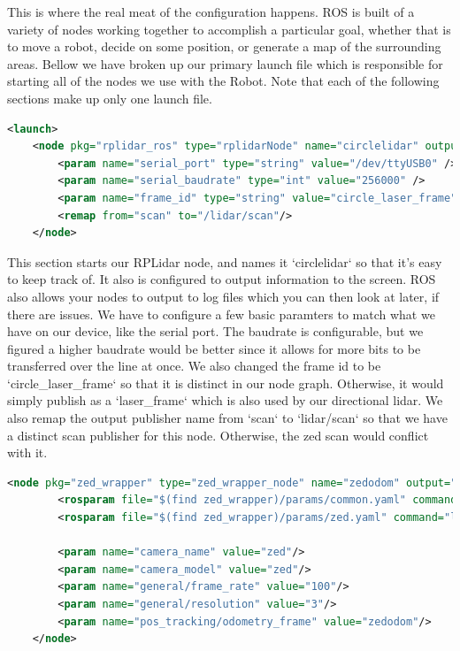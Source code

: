 \documentclass[onecolumn, draftclsnofoot, 10pt, compsoc]{IEEEtran}
\begin{document}
This is where the real meat of the configuration happens. ROS is built of a variety of nodes working together to accomplish a particular goal, whether that is to move a robot, decide on some position, or generate a map of the surrounding areas. Bellow we have broken up our primary launch file which is responsible for starting all of the nodes we use with the Robot. Note that each of the following sections make up only one launch file.

\begin{lstlisting}[language=XML]
<launch>
    <node pkg="rplidar_ros" type="rplidarNode" name="circlelidar" output="screen">
        <param name="serial_port" type="string" value="/dev/ttyUSB0" />
        <param name="serial_baudrate" type="int" value="256000" />
        <param name="frame_id" type="string" value="circle_laser_frame"/>
        <remap from="scan" to="/lidar/scan"/>
    </node>
\end{lstlisting}

This section starts our RPLidar node, and names it `circlelidar` so that it's easy to keep track of. It also is configured to output information to the screen. ROS also allows your nodes to output to log files which you can then look at later, if there are issues. We have to configure a few basic paramters to match what we have on our device, like the serial port. The baudrate is configurable, but we figured a higher baudrate would be better since it allows for more bits to be transferred over the line at once. We also changed the frame id to be `circle\_laser\_frame` so that it is distinct in our node graph. Otherwise, it would simply publish as a `laser\_frame` which is also used by our directional lidar. We also remap the output publisher name from `scan` to `lidar/scan` so that we have a distinct scan publisher for this node. Otherwise, the zed scan would conflict with it.

\begin{lstlisting}[language=XML]
    <node pkg="zed_wrapper" type="zed_wrapper_node" name="zedodom" output="screen">
        <rosparam file="$(find zed_wrapper)/params/common.yaml" command="load"/>
        <rosparam file="$(find zed_wrapper)/params/zed.yaml" command="load"/>

        <param name="camera_name" value="zed"/>
        <param name="camera_model" value="zed"/>
        <param name="general/frame_rate" value="100"/>
        <param name="general/resolution" value="3"/>
        <param name="pos_tracking/odometry_frame" value="zedodom"/>
    </node>
\end{lstlisting}
\end{document}
